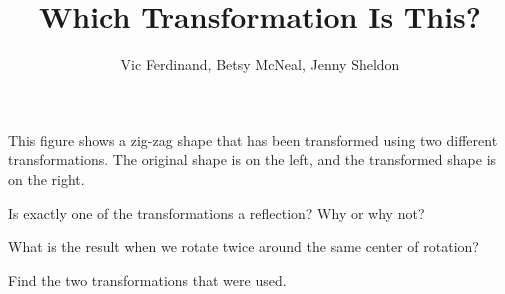 \documentclass{ximera}
\title{Which Transformation Is This?}
\author{Vic Ferdinand, Betsy McNeal, Jenny Sheldon}
\begin{document}
\begin{abstract}
\end{abstract}
\maketitle



This figure shows a zig-zag shape that has been transformed using two different transformations.  The original shape is on the left, and the transformed shape is on the right.

\vskip 0.5in

\begin{center}
\end{center}
\vskip 0.5in


\begin{problem} \label{WhichTrans1}
Is exactly one of the transformations a reflection?  Why or why not?

\end{problem}

\begin{problem}
What is the result when we rotate twice around the same center of rotation? 

\end{problem}

\begin{problem}
Find the two transformations that were used.

\end{problem}
\end{document}
